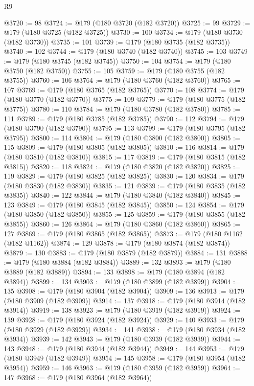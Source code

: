 \begin{lexlean}{R9}
\begin{coremodule}
{{{{{{{{{{{{{{{{{{{{{{{{{{{{{{{{{{{{{{{{{{{{{{{{{{{{{{{{{{{{{{{{{{{{{{{{{{{{{{{{{{{{@3720 := 98
@3724 := @179 (@180 @3720 (@182 @3720))
@3725 := 99
@3729 := @179 (@180 @3725 (@182 @3725))
@3730 := 100
@3734 := @179 (@180 @3730 (@182 @3730))
@3735 := 101
@3739 := @179 (@180 @3735 (@182 @3735))
@3740 := 102
@3744 := @179 (@180 @3740 (@182 @3740))
@3745 := 103
@3749 := @179 (@180 @3745 (@182 @3745))
@3750 := 104
@3754 := @179 (@180 @3750 (@182 @3750))
@3755 := 105
@3759 := @179 (@180 @3755 (@182 @3755))
@3760 := 106
@3764 := @179 (@180 @3760 (@182 @3760))
@3765 := 107
@3769 := @179 (@180 @3765 (@182 @3765))
@3770 := 108
@3774 := @179 (@180 @3770 (@182 @3770))
@3775 := 109
@3779 := @179 (@180 @3775 (@182 @3775))
@3780 := 110
@3784 := @179 (@180 @3780 (@182 @3780))
@3785 := 111
@3789 := @179 (@180 @3785 (@182 @3785))
@3790 := 112
@3794 := @179 (@180 @3790 (@182 @3790))
@3795 := 113
@3799 := @179 (@180 @3795 (@182 @3795))
@3800 := 114
@3804 := @179 (@180 @3800 (@182 @3800))
@3805 := 115
@3809 := @179 (@180 @3805 (@182 @3805))
@3810 := 116
@3814 := @179 (@180 @3810 (@182 @3810))
@3815 := 117
@3819 := @179 (@180 @3815 (@182 @3815))
@3820 := 118
@3824 := @179 (@180 @3820 (@182 @3820))
@3825 := 119
@3829 := @179 (@180 @3825 (@182 @3825))
@3830 := 120
@3834 := @179 (@180 @3830 (@182 @3830))
@3835 := 121
@3839 := @179 (@180 @3835 (@182 @3835))
@3840 := 122
@3844 := @179 (@180 @3840 (@182 @3840))
@3845 := 123
@3849 := @179 (@180 @3845 (@182 @3845))
@3850 := 124
@3854 := @179 (@180 @3850 (@182 @3850))
@3855 := 125
@3859 := @179 (@180 @3855 (@182 @3855))
@3860 := 126
@3864 := @179 (@180 @3860 (@182 @3860))
@3865 := 127
@3869 := @179 (@180 @3865 (@182 @3865))
@3873 := @179 (@180 @1162 (@182 @1162))
@3874 := 129
@3878 := @179 (@180 @3874 (@182 @3874))
@3879 := 130
@3883 := @179 (@180 @3879 (@182 @3879))
@3884 := 131
@3888 := @179 (@180 @3884 (@182 @3884))
@3889 := 132
@3893 := @179 (@180 @3889 (@182 @3889))
@3894 := 133
@3898 := @179 (@180 @3894 (@182 @3894))
@3899 := 134
@3903 := @179 (@180 @3899 (@182 @3899))
@3904 := 135
@3908 := @179 (@180 @3904 (@182 @3904))
@3909 := 136
@3913 := @179 (@180 @3909 (@182 @3909))
@3914 := 137
@3918 := @179 (@180 @3914 (@182 @3914))
@3919 := 138
@3923 := @179 (@180 @3919 (@182 @3919))
@3924 := 139
@3928 := @179 (@180 @3924 (@182 @3924))
@3929 := 140
@3933 := @179 (@180 @3929 (@182 @3929))
@3934 := 141
@3938 := @179 (@180 @3934 (@182 @3934))
@3939 := 142
@3943 := @179 (@180 @3939 (@182 @3939))
@3944 := 143
@3948 := @179 (@180 @3944 (@182 @3944))
@3949 := 144
@3953 := @179 (@180 @3949 (@182 @3949))
@3954 := 145
@3958 := @179 (@180 @3954 (@182 @3954))
@3959 := 146
@3963 := @179 (@180 @3959 (@182 @3959))
@3964 := 147
@3968 := @179 (@180 @3964 (@182 @3964))
}}}}}}}}}}}}}}}}}}}}}}}}}}}}}}}}}}}}}}}}}}}}}}}}}}}}}}}}}}}}}}}}}}}}}}}}}}}}}}}}}}}}
\end{coremodule}
\end{lexlean}
